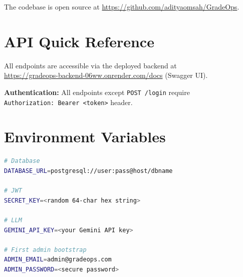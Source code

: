 \documentclass[12pt,a4paper]{article}
\begin{document}
The codebase is open source at \url{https://github.com/adityaomsah/GradeOps}.

\appendix
\section{API Quick Reference}

All endpoints are accessible via the deployed backend at\\
\url{https://gradeops-backend-06ww.onrender.com/docs} (Swagger UI).

\textbf{Authentication:} All endpoints except \texttt{POST /login} require\\
\texttt{Authorization: Bearer <token>} header.

\section{Environment Variables}

\begin{lstlisting}[language=bash, caption={Required .env variables}]
# Database
DATABASE_URL=postgresql://user:pass@host/dbname

# JWT
SECRET_KEY=<random 64-char hex string>

# LLM
GEMINI_API_KEY=<your Gemini API key>

# First admin bootstrap
ADMIN_EMAIL=admin@gradeops.com
ADMIN_PASSWORD=<secure password>
\end{lstlisting}
\end{document}
